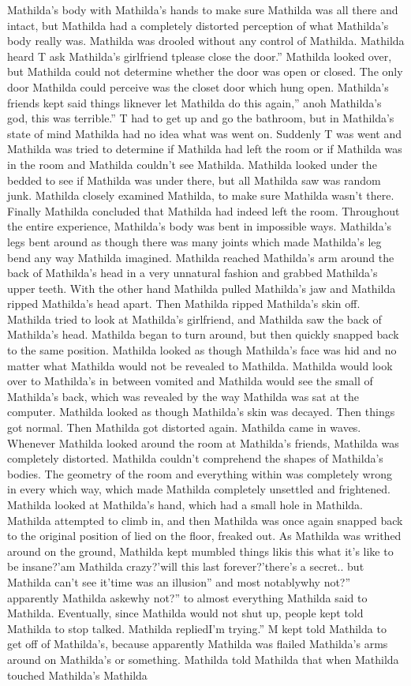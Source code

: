 \documentclass[12pt]{book}
\begin{document}
Mathilda's body with Mathilda's hands to make sure Mathilda was all there and intact, but Mathilda had a completely distorted perception of what Mathilda's body really was. Mathilda was drooled without any control of Mathilda. Mathilda heard T ask Mathilda's girlfriend tplease close the door.'' Mathilda looked over, but Mathilda could not determine whether the door was open or closed. The only door Mathilda could perceive was the closet door which hung open. Mathilda's friends kept said things liknever let Mathilda do this again,'' anoh Mathilda's god, this was terrible.'' T had to get up and go the bathroom, but in Mathilda's state of mind Mathilda had no idea what was went on. Suddenly T was went and Mathilda was tried to determine if Mathilda had left the room or if Mathilda was in the room and Mathilda couldn't see Mathilda. Mathilda looked under the bedded to see if Mathilda was under there, but all Mathilda saw was random junk. Mathilda closely examined Mathilda, to make sure Mathilda wasn't there. Finally Mathilda concluded that Mathilda had indeed left the room. Throughout the entire experience, Mathilda's body was bent in impossible ways. Mathilda's legs bent around as though there was many joints which made Mathilda's leg bend any way Mathilda imagined. Mathilda reached Mathilda's arm around the back of Mathilda's head in a very unnatural fashion and grabbed Mathilda's upper teeth. With the other hand Mathilda pulled Mathilda's jaw and Mathilda ripped Mathilda's head apart. Then Mathilda ripped Mathilda's skin off. Mathilda tried to look at Mathilda's girlfriend, and Mathilda saw the back of Mathilda's head. Mathilda began to turn around, but then quickly snapped back to the same position. Mathilda looked as though Mathilda's face was hid and no matter what Mathilda would not be revealed to Mathilda. Mathilda would look over to Mathilda's in between vomited and Mathilda would see the small of Mathilda's back, which was revealed by the way Mathilda was sat at the computer. Mathilda looked as though Mathilda's skin was decayed. Then things got normal. Then Mathilda got distorted again. Mathilda came in waves. Whenever Mathilda looked around the room at Mathilda's friends, Mathilda was completely distorted. Mathilda couldn't comprehend the shapes of Mathilda's bodies. The geometry of the room and everything within was completely wrong in every which way, which made Mathilda completely unsettled and frightened. Mathilda looked at Mathilda's hand, which had a small hole in Mathilda. Mathilda attempted to climb in, and then Mathilda was once again snapped back to the original position of lied on the floor, freaked out. As Mathilda was writhed around on the ground, Mathilda kept mumbled things likis this what it's like to be insane?'am Mathilda crazy?'will this last forever?'there's a secret.. but Mathilda can't see it'time was an illusion'' and most notablywhy not?'' apparently Mathilda askewhy not?'' to almost everything Mathilda said to Mathilda. Eventually, since Mathilda would not shut up, people kept told Mathilda to stop talked. Mathilda repliedI'm trying.'' M kept told Mathilda to get off of Mathilda's, because apparently Mathilda was flailed Mathilda's arms around on Mathilda's or something. Mathilda told Mathilda that when Mathilda touched Mathilda's Mathilda 
\end{document}
